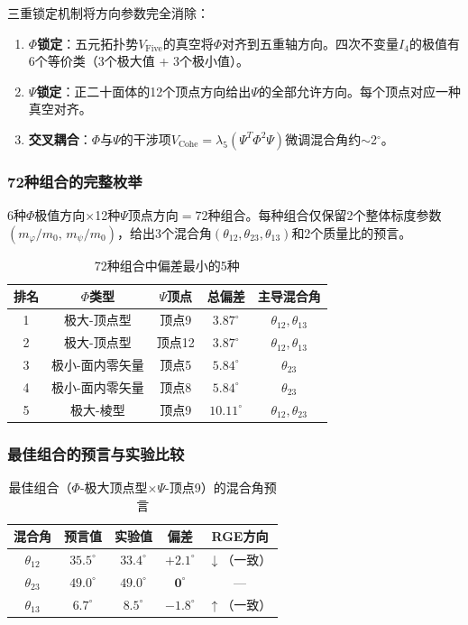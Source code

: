 \documentclass[12pt,a4paper,twocolumn]{article}
\renewcommand{\phi}{\varphi}
\begin{document}
三重锁定机制将方向参数完全消除：

\begin{enumerate}
\item \textbf{$\Phi$锁定}：五元拓扑势$V_{\text{Five}}$的真空将$\Phi$对齐到五重轴方向。四次不变量$I_4$的极值有6个等价类（3个极大值 + 3个极小值）。
\item \textbf{$\Psi$锁定}：正二十面体的12个顶点方向给出$\Psi$的全部允许方向。每个顶点对应一种真空对齐。
\item \textbf{交叉耦合}：$\Phi$与$\Psi$的干涉项$V_{\text{Cohe}} = \lambda_5 (\Psi^T \Phi^2 \Psi)$微调混合角约$\sim$2$^\circ$。
\end{enumerate}

\subsubsection{72种组合的完整枚举}

6种$\Phi$极值方向$\times$12种$\Psi$顶点方向$=72$种组合。每种组合仅保留2个整体标度参数$(m_\phi/m_0, \, m_\psi/m_0)$，给出3个混合角$(\theta_{12}, \theta_{23}, \theta_{13})$和2个质量比的预言。

\begin{table}[htbp]
\centering
\caption{72种组合中偏差最小的5种}
\label{tab:72_combos}
\begin{tabular}{ccccc}
\hline
排名 & $\Phi$类型 & $\Psi$顶点 & 总偏差 & 主导混合角 \\
\hline
1 & 极大-顶点型 & 顶点9 & $3.87^\circ$ & $\theta_{12},\theta_{13}$ \\
2 & 极大-顶点型 & 顶点12 & $3.87^\circ$ & $\theta_{12},\theta_{13}$ \\
3 & 极小-面内零矢量 & 顶点5 & $5.84^\circ$ & $\theta_{23}$ \\
4 & 极小-面内零矢量 & 顶点8 & $5.84^\circ$ & $\theta_{23}$ \\
5 & 极大-棱型 & 顶点9 & $10.11^\circ$ & $\theta_{12},\theta_{23}$ \\
\hline
\end{tabular}
\end{table}

\subsubsection{最佳组合的预言与实验比较}

\begin{table}[htbp]
\centering
\caption{最佳组合（$\Phi$-极大顶点型$\times\Psi$-顶点9）的混合角预言}
\label{tab:mixing_angles}
\begin{tabular}{ccccc}
\hline
混合角 & 预言值 & 实验值 & 偏差 & RGE方向 \\
\hline
$\theta_{12}$ & $35.5^\circ$ & $33.4^\circ$ & $+2.1^\circ$ & $\downarrow$（一致） \\
$\theta_{23}$ & $49.0^\circ$ & $49.0^\circ$ & $\mathbf{0^\circ}$ & — \\
$\theta_{13}$ & $6.7^\circ$ & $8.5^\circ$ & $-1.8^\circ$ & $\uparrow$（一致） \\
\hline
\end{tabular}
\end{table}
\end{document}
